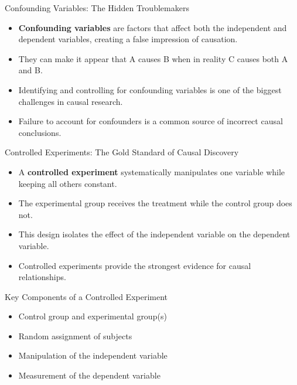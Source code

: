 \documentclass{beamer}
\begin{document}
\begin{frame}{Confounding Variables: The Hidden Troublemakers}
    \begin{itemize}
        \item \textbf{Confounding variables} are factors that affect both the independent and dependent variables, creating a false impression of causation.
        \item They can make it appear that A causes B when in reality C causes both A and B.
        \item Identifying and controlling for confounding variables is one of the biggest challenges in causal research.
        \item Failure to account for confounders is a common source of incorrect causal conclusions.
    \end{itemize}
    
    \begin{center}
    \end{center}
\end{frame}

\begin{frame}{Controlled Experiments: The Gold Standard of Causal Discovery}
    \begin{itemize}
        \item A \textbf{controlled experiment} systematically manipulates one variable while keeping all others constant.
        \item The experimental group receives the treatment while the control group does not.
        \item This design isolates the effect of the independent variable on the dependent variable.
        \item Controlled experiments provide the strongest evidence for causal relationships.
    \end{itemize}
    
    \begin{block}{Key Components of a Controlled Experiment}
        \begin{itemize}
            \item Control group and experimental group(s)
            \item Random assignment of subjects
            \item Manipulation of the independent variable
            \item Measurement of the dependent variable
        \end{itemize}
    \end{block}
\end{frame}
\end{document}
